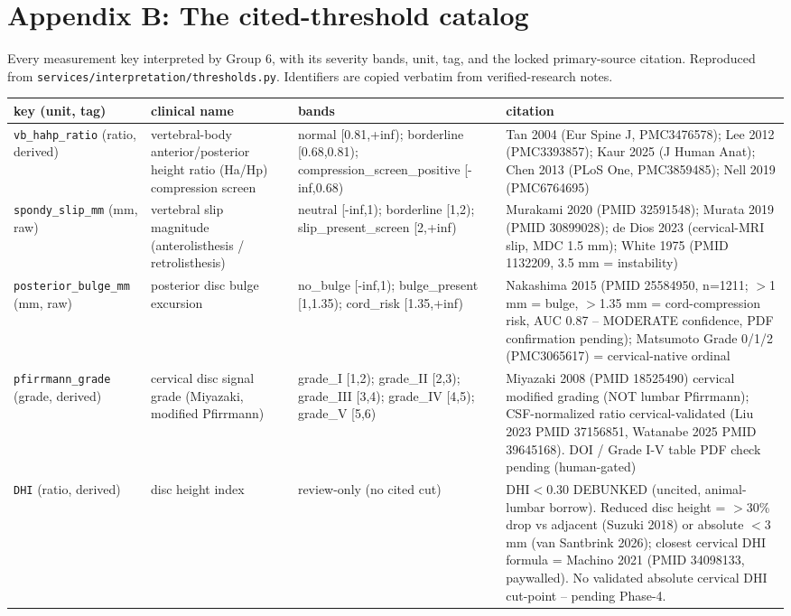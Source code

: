 \section{Appendix B: The cited-threshold catalog}
\label{app:catalog}
Every measurement key interpreted by Group 6, with its severity bands, unit, tag, and the locked primary-source citation. Reproduced from \texttt{services/interpretation/thresholds.py}. Identifiers are copied verbatim from verified-research notes.
\begin{center}\footnotesize
\begin{longtable}{p{2.6cm} p{3.3cm} p{4.5cm} p{4.4cm}}
\toprule
key (unit, tag) & clinical name & bands & citation \\
\midrule \endhead
\texttt{vb\_hahp\_ratio} (ratio, derived) & vertebral-body anterior/posterior height ratio (Ha/Hp) compression screen & normal [0.81,+inf); borderline [0.68,0.81); compression\_screen\_positive [-inf,0.68) & Tan 2004 (Eur Spine J, PMC3476578); Lee 2012 (PMC3393857); Kaur 2025 (J Human Anat); Chen 2013 (PLoS One, PMC3859485); Nell 2019 (PMC6764695) \\
\addlinespace
\texttt{spondy\_slip\_mm} (mm, raw) & vertebral slip magnitude (anterolisthesis / retrolisthesis) & neutral [-inf,1); borderline [1,2); slip\_present\_screen [2,+inf) & Murakami 2020 (PMID 32591548); Murata 2019 (PMID 30899028); de Dios 2023 (cervical-MRI slip, MDC 1.5 mm); White 1975 (PMID 1132209, 3.5 mm = instability) \\
\addlinespace
\texttt{posterior\_bulge\_mm} (mm, raw) & posterior disc bulge excursion & no\_bulge [-inf,1); bulge\_present [1,1.35); cord\_risk [1.35,+inf) & Nakashima 2015 (PMID 25584950, n=1211; $>$1 mm = bulge, $>$1.35 mm = cord-compression risk, AUC 0.87 -- MODERATE confidence, PDF confirmation pending); Matsumoto Grade 0/1/2 (PMC3065617) = cervical-native ordinal \\
\addlinespace
\texttt{pfirrmann\_grade} (grade, derived) & cervical disc signal grade (Miyazaki, modified Pfirrmann) & grade\_I [1,2); grade\_II [2,3); grade\_III [3,4); grade\_IV [4,5); grade\_V [5,6) & Miyazaki 2008 (PMID 18525490) cervical modified grading (NOT lumbar Pfirrmann); CSF-normalized ratio cervical-validated (Liu 2023 PMID 37156851, Watanabe 2025 PMID 39645168). DOI / Grade I-V table PDF check pending (human-gated) \\
\addlinespace
\texttt{DHI} (ratio, derived) & disc height index & review-only (no cited cut) & DHI$<$0.30 DEBUNKED (uncited, animal-lumbar borrow). Reduced disc height = $>$30\% drop vs adjacent (Suzuki 2018) or absolute $<$3 mm (van Santbrink 2026); closest cervical DHI formula = Machino 2021 (PMID 34098133, paywalled). No validated absolute cervical DHI cut-point -- pending Phase-4. \\

\end{longtable}
\end{center}
